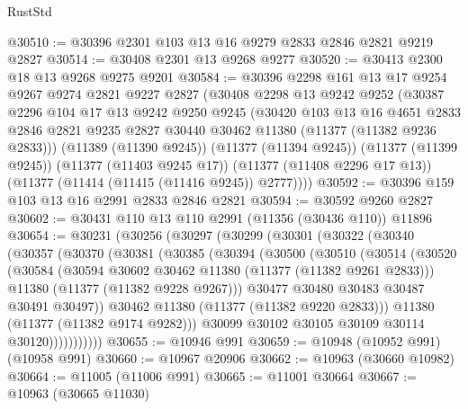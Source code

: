 \begin{lexlean}{RustStd}
\begin{coremodule}
@30510 := @30396 @2301 @103 @13 @16 @9279 @2833 @2846 @2821 @9219 @2827
@30514 := @30408 @2301 @13 @9268 @9277
@30520 := @30413 @2300 @18 @13 @9268 @9275 @9201
@30584 := @30396
    @2298
    @161
    @13
    @17
    @9254
    @9267
    @9274
    @2821
    @9227
    @2827
    (@30408
      @2298
      @13
      @9242
      @9252
      (@30387
        @2296
        @104
        @17
        @13
        @9242
        @9250
        @9245
        (@30420
          @103
          @13
          @16
          @4651
          @2833
          @2846
          @2821
          @9235
          @2827
          @30440
          @30462
          @11380
          (@11377 (@11382 @9236 @2833)))
        (@11389 (@11390 @9245))
        (@11377 (@11394 @9245))
        (@11377 (@11399 @9245))
        (@11377 (@11403 @9245 @17))
        (@11377 (@11408 @2296 @17 @13))
        (@11377 (@11414 (@11415 (@11416 @9245)) @2777))))
@30592 := @30396 @159 @103 @13 @16 @2991 @2833 @2846 @2821
@30594 := @30592 @9260 @2827
@30602 := @30431 @110 @13 @110 @2991 (@11356 (@30436 @110)) @11896
@30654 := @30231
    (@30256
      (@30297
        (@30299
          (@30301
            (@30322
              (@30340
                (@30357
                  (@30370
                    (@30381
                      (@30385
                        (@30394
                          (@30500
                            (@30510
                              (@30514
                                (@30520
                                  (@30584
                                    (@30594 @30602 @30462 @11380 (@11377 (@11382 @9261 @2833)))
                                    @11380
                                    (@11377 (@11382 @9228 @9267)))
                                  @30477
                                  @30480
                                  @30483
                                  @30487
                                  @30491
                                  @30497))
                              @30462
                              @11380
                              (@11377 (@11382 @9220 @2833)))
                            @11380
                            (@11377 (@11382 @9174 @9282)))
                          @30099
                          @30102
                          @30105
                          @30109
                          @30114
                          @30120)))))))))))
@30655 := @10946 @991
@30659 := @10948 (@10952 @991) (@10958 @991)
@30660 := @10967 @20906
@30662 := @10963 (@30660 @10982)
@30664 := @11005 (@11006 @991)
@30665 := @11001 @30664
@30667 := @10963 (@30665 @11030)

\end{coremodule}
\end{lexlean}
